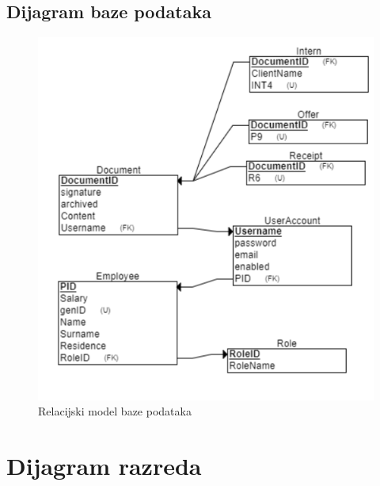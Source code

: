 			
			
			
			
			
			
			
			
			
				
			
			\subsection{Dijagram baze podataka}
				
				\begin{figure}[H]
					\includegraphics[scale=0.58]{slike/REL_schema.png} %
					\centering
					\caption{Relacijski model baze podataka}
					\label{REL}
				\end{figure}
				
				
			
		
			
			
		\section{Dijagram razreda}
		
